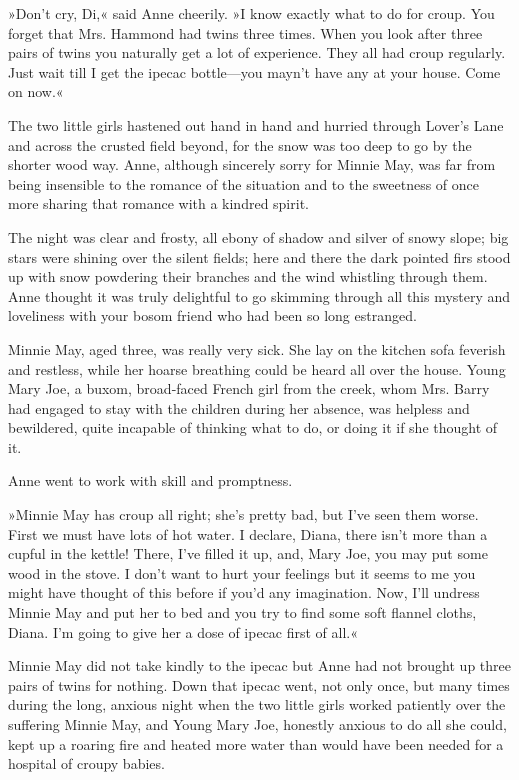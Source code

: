 »Don't cry, Di,« said Anne cheerily. »I know exactly what to do for croup. You forget that Mrs. Hammond had twins three times. When you look after three pairs of twins you naturally get a lot of experience. They all had croup regularly. Just wait till I get the ipecac bottle—you mayn't have any at your house. Come on now.«

The two little girls hastened out hand in hand and hurried through Lover's Lane and across the crusted field beyond, for the snow was too deep to go by the shorter wood way. Anne, although sincerely sorry for Minnie May, was far from being insensible to the romance of the situation and to the sweetness of once more sharing that romance with a kindred spirit.

The night was clear and frosty, all ebony of shadow and silver of snowy slope; big stars were shining over the silent fields; here and there the dark pointed firs stood up with snow powdering their branches and the wind whistling through them. Anne thought it was truly delightful to go skimming through all this mystery and loveliness with your bosom friend who had been so long estranged.

Minnie May, aged three, was really very sick. She lay on the kitchen sofa feverish and restless, while her hoarse breathing could be heard all over the house. Young Mary Joe, a buxom, broad-faced French girl from the creek, whom Mrs. Barry had engaged to stay with the children during her absence, was helpless and bewildered, quite incapable of thinking what to do, or doing it if she thought of it.

Anne went to work with skill and promptness.

»Minnie May has croup all right; she's pretty bad, but I've seen them worse. First we must have lots of hot water. I declare, Diana, there isn't more than a cupful in the kettle! There, I've filled it up, and, Mary Joe, you may put some wood in the stove. I don't want to hurt your feelings but it seems to me you might have thought of this before if you'd any imagination. Now, I'll undress Minnie May and put her to bed and you try to find some soft flannel cloths, Diana. I'm going to give her a dose of ipecac first of all.«

Minnie May did not take kindly to the ipecac but Anne had not brought up three pairs of twins for nothing. Down that ipecac went, not only once, but many times during the long, anxious night when the two little girls worked patiently over the suffering Minnie May, and Young Mary Joe, honestly anxious to do all she could, kept up a roaring fire and heated more water than would have been needed for a hospital of croupy babies.

